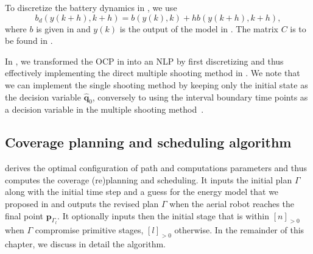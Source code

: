 To discretize the battery dynamics in , we use
\begin{equation}\label{eq:batt-euler}
  b_d(y(k+h),k+h)=b(y(k),k)+hb(y(k+h),k+h),
\end{equation}
where $b$ is given in  and $y(k)$ is the output of the model in . The matrix $C$ is to be found in .

In , we transformed the OCP in  into an NLP by first discretizing and thus effectively implementing the direct multiple shooting method in . We note that we can implement the single shooting method by keeping only the initial state as the decision variable $\hat{\mathbf{q}}_0$, conversely to using the interval boundary time points as a decision variable in the multiple shooting method~\citep{rawlings2017model}.



\subsection{Coverage planning and scheduling algorithm}
\label{sec:algo}

 derives the optimal configuration of path and computations parameters and thus computes the coverage (re)planning and scheduling. It inputs the initial plan $\Gamma$ along with the initial time step and a guess for the energy model that we proposed in  and outputs the revised plan $\Gamma$ when the aerial robot reaches the final point $\mathbf{p}_{\Gamma_l}$. It optionally inputs then the initial stage that is within $[n]_{>0}$ when $\Gamma$ compromise primitive stages, $[l]_{>0}$ otherwise. In the remainder of this chapter, we discuss in detail the algorithm.

